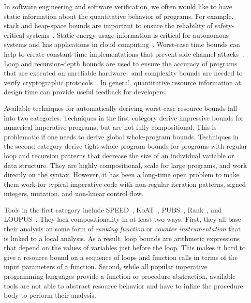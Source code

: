 \documentclass[nocopyrightspace,preprint,pldi]{sigplanconf-pldi15}
\begin{document}
In software engineering and software verification,
we often would like to have static information
about the quantitative behavior of programs.
For example, stack and heap-space bounds
are important to ensure the reliability of
safety-critical systems~\cite{veristack14,Regehr05}.
Static energy usage information is critical
for autonomous systems and has applications in
cloud computing~\cite{CohenZSL12,CarrollH10}.
Worst-case time bounds can help to create
constant-time implementations that prevent
side-channel attacks~\cite{KasperS09,BartheBCLP14}.
Loop and recursion-depth bounds are used to
ensure the accuracy of programs that are executed
on unreliable hardware~\cite{CarbinMR13} and
complexity bounds are needed to verify cryptographic
protocols~\cite{BartheGB09}.  In general, quantitative
resource information at design time can provide useful
feedback for developers.





Available techniques for automatically deriving worst-case resource bounds
fall into two categories.  Techniques
in the first category derive impressive bounds for
numerical imperative programs, but are not fully compositional.
This is problematic if one needs to derive global whole-program bounds.
Techniques in the second category derive tight whole-program
bounds for programs with regular loop and recursion patterns that
decrease the size of an individual variable or data structure.
They are highly compositional, scale for large
programs, and work directly on the syntax.  However, %
it has been
a long-time open problem to make them work for typical imperative code
with non-regular iteration patterns, signed integers, mutation, and non-linear
control flow. %

Tools in the first category include
SPEED~\cite{GulwaniMC09}, KoAT~\cite{BrockschmidtEFFG14},
PUBS~\cite{AlbertAGPZ12}, Rank~\cite{AliasDFG10},
and LOOPUS~\cite{SinnZV14}.
They lack compositionality in at least two ways.
First, they all base their analysis on some form of
\emph{ranking function} or \emph{counter instrumentation}
that is linked to a local analysis.  As a result, loop bounds are
arithmetic expressions that depend on the values of
variables just before the loop.
This makes it hard to give a
resource bound on a sequence of loops and function calls in
terms of the input parameters of a function.
Second, while all popular imperative programming languages
provide a function or procedure abstraction, available
tools are not able to abstract resource behavior
and have to inline the procedure body to perform their
analysis.
\end{document}
